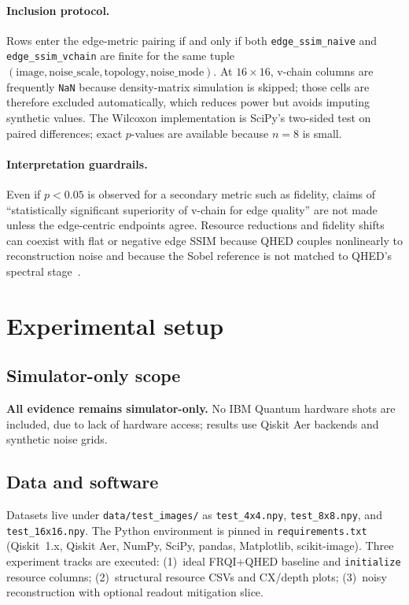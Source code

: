 \paragraph{Inclusion protocol.}
Rows enter the edge-metric pairing if and only if both \texttt{edge\_ssim\_naive} and \texttt{edge\_ssim\_vchain} are finite for the same tuple $(\mathrm{image},\mathrm{noise\_scale},\mathrm{topology},\mathrm{noise\_mode})$. At $16\times16$, v-chain columns are frequently \texttt{NaN} because density-matrix simulation is skipped; those cells are therefore excluded automatically, which reduces power but avoids imputing synthetic values. The Wilcoxon implementation is SciPy's two-sided test on paired differences; exact $p$-values are available because $n{=}8$ is small.

\paragraph{Interpretation guardrails.}
Even if $p<0.05$ is observed for a secondary metric such as fidelity, claims of ``statistically significant superiority of v-chain for edge quality'' are not made unless the edge-centric endpoints agree. Resource reductions and fidelity shifts can coexist with flat or negative edge SSIM because QHED couples nonlinearly to reconstruction noise and because the Sobel reference is not matched to QHED's spectral stage~\cite{Geng2022HybridNISQEdge}.

\section{Experimental setup}

\subsection{Simulator-only scope}
\textbf{All evidence remains simulator-only.} No IBM Quantum hardware shots are included, due to lack of hardware access; results use Qiskit Aer backends and synthetic noise grids.

\subsection{Data and software}
Datasets live under \texttt{data/test\_images/} as \texttt{test\_4x4.npy}, \texttt{test\_8x8.npy}, and \texttt{test\_16x16.npy}. The Python environment is pinned in \texttt{requirements.txt} (Qiskit~1.x, Qiskit Aer, NumPy, SciPy, pandas, Matplotlib, scikit-image). Three experiment tracks are executed: (1)~ideal FRQI+QHED baseline and \texttt{initialize} resource columns; (2)~structural resource CSVs and CX/depth plots; (3)~noisy reconstruction with optional readout mitigation slice.

